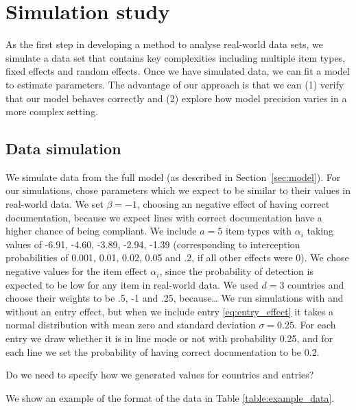 \documentclass{article}
\begin{document}
\section{Simulation study}
As the first step in developing a method to analyse real-world data sets, we simulate a data set that contains key complexities including multiple item types, fixed effects and random effects. Once we have simulated data, we can fit a model to estimate parameters. The advantage of our approach is that we can (1) verify that our model behaves correctly and (2) explore how model precision varies in a more complex setting.

\subsection{Data simulation}
We simulate data from the full model (as described in Section~\ref{sec:model}). For our simulations, chose parameters which we expect to be similar to their values in real-world data. We set \(\beta=-1\), choosing an negative effect of having correct documentation, because we expect lines with correct documentation have a higher chance of being compliant. We include $a=5$ item types with \(\alpha_i\) taking values of -6.91, -4.60, -3.89, -2.94, -1.39 (corresponding to interception probabilities of 0.001, 0.01, 0.02, 0.05 and .2, if all other effects were 0). We chose negative values for the item effect $\alpha_i$, since the probability of detection is expected to be low for any item in real-world data. We used $d=3$ countries and choose their weights to be .5, -1 and .25, {\color{red} because\ldots}
{
\color{red}
We run simulations with and without an entry effect, but when we include entry \eqref{eq:entry_effect} it takes a normal distribution with mean zero and standard deviation \(\sigma = 0.25\). For each entry we draw whether it is in line mode or not with probability 0.25, and for each line we set the probability of having correct documentation to be 0.2.}

{\color{red} Do we need to specify how we generated values for countries and entries?}  

We show an example of the format of the data in Table \ref{table:example_data}.
\end{document}

